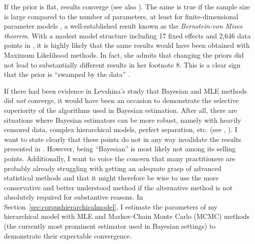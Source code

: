 \documentclass[USenglish]{article}
\begin{document}
If the prior is flat, results converge (see also \citealp[347]{GelmanHill2006}).
The same is true if the sample size is large compared to the number of parameters, at least for finite-dimensional parameter models \citep[1119--1120]{Freedman1999}, a well-established result known as the \textit{Bernstein-von Mises theorem}.
With a modest model structure including 17 fixed effects and 2,646 data points in \cite{Levshina2016}, it is highly likely that the same results would have been obtained with Maximum Likelihood methods.
In fact, she admits that changing the priors did not lead to substantially different results in her footnote 8.
This is a clear sign that the prior is ``swamped by the data'' \citep[1119]{Freedman1999}.

If there had been evidence in Levshina's study that Bayesian and MLE methods did \textit{not} converge, it would have been an occasion to demonstrate the selective superiority of the algorithms used in Bayesian estimation.
After all, there are situations where Bayesian estimators can be more robust, namely with heavily censored data, complex hierarchical models, perfect separation, etc. (see \citealp{Freedman1999}, \citealp[345--348]{GelmanHill2006}).
I want to state clearly that these points do not in any way invalidate the results presented in \cite{Levshina2016}.
However, being ``Bayesian'' is most likely not among its selling points.
Additionally, I want to voice the concern that many practitioners are probably already struggling with getting an adequate grasp of advanced statistical methods and that it might therefore be wise to use the more conservative and better understood method if the alternative method is not absolutely required for substantive reasons.
In Section~\ref{sec:corpushierarchicalmodel}, I estimate the parameters of my hierarchical model with MLE and Markov-Chain Monte Carlo (MCMC) methods (the currently most prominent estimator used in Bayesian settings) to demonstrate their expectable convergence.


\end{document}
